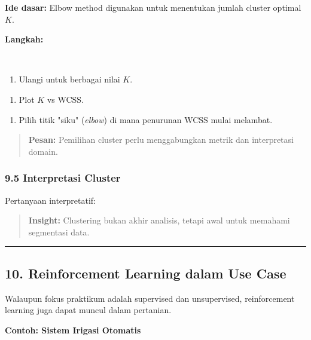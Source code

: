 \documentclass[12pt,a4paper]{article}
\begin{document}
\textbf{Ide dasar:} Elbow method digunakan untuk menentukan jumlah cluster optimal $K$.


\textbf{Langkah:}


\\[
\begin{tabular}{|l|l|l|}
\hline
\text{WCSS} = \sum_{k=1}^{K} \sum_{x_i \in C_k} \ & x_i - \mu_k\ & ^2 \\
\hline
\end{tabular}
\\]


\begin{enumerate}
\item Ulangi untuk berbagai nilai $K$.
\end{enumerate}

\begin{enumerate}
\item Plot $K$ vs WCSS.
\end{enumerate}

\begin{enumerate}
\item Pilih titik "siku" (\emph{elbow}) di mana penurunan WCSS mulai melambat.
\end{enumerate}


\begin{quote}
\textbf{Pesan:} Pemilihan cluster perlu menggabungkan metrik dan interpretasi domain.\end{quote}


\subsubsection{9.5 Interpretasi Cluster}

Pertanyaan interpretatif:


\begin{quote}
\textbf{Insight:} Clustering bukan akhir analisis, tetapi awal untuk memahami segmentasi data.\end{quote}


\hrule


\subsection{10. Reinforcement Learning dalam Use Case}

Walaupun fokus praktikum adalah supervised dan unsupervised, reinforcement learning juga dapat muncul dalam pertanian.


\textbf{Contoh: Sistem Irigasi Otomatis}
\end{document}
